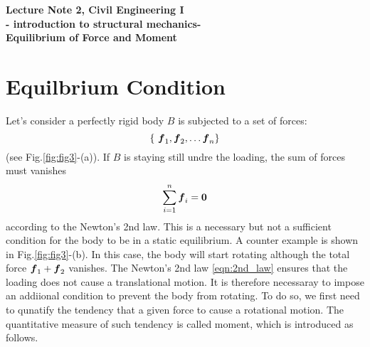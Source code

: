 \documentclass[10pt,a4j]{article}
\newlength{\minitwocolumn}
\begin{document}
\newcommand{\fat}[1]{\mbox{\boldmath $#1$}}
\newcommand{\D}{\partial}
\newcommand{\w}{\omega}
\newcommand{\ga}{\alpha}
\newcommand{\gb}{\beta}
\newcommand{\gx}{\xi}
\newcommand{\gz}{\zeta}
\newcommand{\vhat}[1]{\hat{\fat{#1}}}
\newcommand{\spc}{\vspace{0.7\baselineskip}}
\newcommand{\halfspc}{\vspace{0.3\baselineskip}}

\newcommand{\twofig}[2]
 {
   \begin{figure}
     \begin{minipage}[t]{\minitwocolumn}
         \begin{center}   #1
         \end{center}
     \end{minipage}
         \hspace{\columnsep}
     \begin{minipage}[t]{\minitwocolumn}
         \begin{center} #2
         \end{center}
     \end{minipage}
   \end{figure}
 }
\begin{center}
	{\Large \bf Lecture Note 2, Civil Engineering I \\
	- introduction to structural mechanics-\\
	Equilibrium of Force and Moment
	}  \\
\end{center}
\vspace{1.5cm}
\setcounter{section}{1}
\section{Equilbrium Condition}
Let's consider a perfectly rigid body $B$ is subjected to a set of forces:
\[ 
	\left\{\ \fat{f}_1, \fat{f}_2, \dots \fat{f}_{n} \right\}
\]
(see Fig.\ref{fig:fig3}-(a)).
If $B$ is staying still undre the loading, the sum of forces must vanishes
\begin{equation}
	\sum_{i=1}^n \fat{f}_i = \fat{0}
	\label{eqn:2nd_law}
\end{equation}
according to the Newton's 2nd law. This is a necessary but not a sufficient condition 
for the body to be in a static equilibrium. A counter example is shown in Fig.\ref{fig:fig3}-(b).
In this case, the body will start rotating although the total force $\fat{f}_1+\fat{f}_2$ vanishes.
The Newton's 2nd law \ref{eqn:2nd_law} ensures that the loading does not cause a 
 translational motion. 
 It is therefore necessaray to impose an addiional condition to prevent the body from rotating. 
 To do so, we first need to qunatify the tendency that a given force to cause a rotational motion. 
The quantitative measure of such tendency is called moment, which is introduced as follows. 
\end{document}

